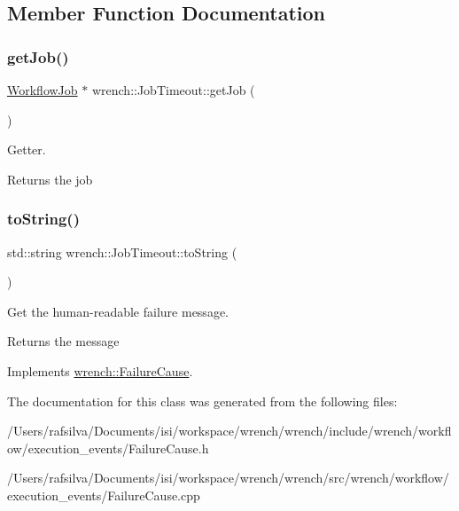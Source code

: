 \subsection{Member Function Documentation}
\mbox{\label{classwrench_1_1_job_timeout_a6c3fdde31850803e7eb2e159be735880}} 
\subsubsection{\texorpdfstring{get\+Job()}{getJob()}}
{\footnotesize\ttfamily \hyperlink{classwrench_1_1_workflow_job}{Workflow\+Job} $\ast$ wrench\+::\+Job\+Timeout\+::get\+Job (\begin{DoxyParamCaption}{ }\end{DoxyParamCaption})}



Getter. 

\begin{DoxyReturn}{Returns}
the job 
\end{DoxyReturn}
\mbox{\label{classwrench_1_1_job_timeout_a91515ca59f71777de74a4b0b169d12e7}} 
\subsubsection{\texorpdfstring{to\+String()}{toString()}}
{\footnotesize\ttfamily std\+::string wrench\+::\+Job\+Timeout\+::to\+String (\begin{DoxyParamCaption}{ }\end{DoxyParamCaption})\hspace{0.3cm}{\ttfamily [virtual]}}



Get the human-\/readable failure message. 

\begin{DoxyReturn}{Returns}
the message 
\end{DoxyReturn}


Implements \hyperlink{classwrench_1_1_failure_cause_afbad248ebe902409f2cd4f1d6f2b867d}{wrench\+::\+Failure\+Cause}.



The documentation for this class was generated from the following files\+:\begin{DoxyCompactItemize}
\item 
/\+Users/rafsilva/\+Documents/isi/workspace/wrench/wrench/include/wrench/workflow/execution\+\_\+events/Failure\+Cause.\+h\item 
/\+Users/rafsilva/\+Documents/isi/workspace/wrench/wrench/src/wrench/workflow/execution\+\_\+events/Failure\+Cause.\+cpp\end{DoxyCompactItemize}
